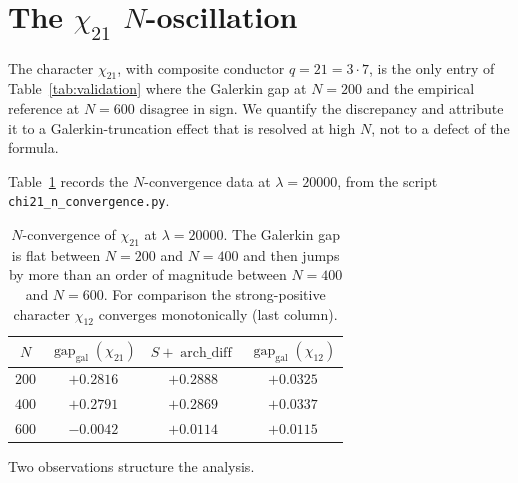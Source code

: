 \documentclass[a4paper,10pt,twocolumn]{article}
\theoremstyle{definition}
\theoremstyle{remark}
\newcommand{\gap}{\operatorname{gap}}
\newcommand{\chifn}{\chi}
\newcommand{\archdiff}{\operatorname{arch\_diff}}
\begin{document}
\section{\texorpdfstring{The $\chi_{21}$ $N$-oscillation}{The chi21 N-oscillation}}
\label{sec:chi21}

The character $\chifn_{21}$, with composite conductor $q=21=3\cdot 7$,
is the only entry of Table~\ref{tab:validation} where the Galerkin
gap at $N=200$ and the empirical reference at $N=600$ disagree in
sign. We quantify the discrepancy and attribute it to a
Galerkin-truncation effect that is resolved at high $N$, not to a
defect of the formula.

Table~\ref{tab:chi21} records the $N$-convergence data at
$\lambda=20000$, from the script \texttt{chi21\_n\_convergence.py}.

\begin{table}[h]
\caption{$N$-convergence of $\chifn_{21}$ at $\lambda=20000$.
  The Galerkin gap is flat between $N=200$ and $N=400$ and then
  jumps by more than an order of magnitude between $N=400$ and
  $N=600$. For comparison the strong-positive character
  $\chifn_{12}$ converges monotonically (last column).}
\label{tab:chi21}
\centering\small
\begin{tabular}{@{}cccc@{}}
\toprule
$N$ & $\gap_{\mathrm{gal}}(\chifn_{21})$ & $S+\archdiff$ & $\gap_{\mathrm{gal}}(\chifn_{12})$ \\
\midrule
$200$ & $+0.2816$ & $+0.2888$ & $+0.0325$ \\
$400$ & $+0.2791$ & $+0.2869$ & $+0.0337$ \\
$600$ & $-0.0042$ & $+0.0114$ & $+0.0115$ \\
\bottomrule
\end{tabular}
\end{table}

Two observations structure the analysis.
\end{document}
